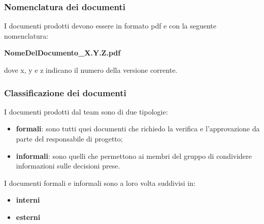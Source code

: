 \subsubsection{Nomenclatura dei documenti}
I documenti prodotti devono essere in formato pdf e con la seguente nomenclatura:
\begin{center}
    \textbf{NomeDelDocumento\_X.Y.Z.pdf}
\end{center}
dove x, y e z indicano il numero della versione corrente.

\subsubsection{Classificazione dei documenti}
I documenti prodotti dal team sono di due tipologie:
\begin{itemize}
    \item \textbf{formali}: sono tutti quei documenti che richiedo la verifica e l'approvazione da parte del responsabile di progetto;
    \item \textbf{informali}: sono quelli che permettono ai membri del gruppo di condividere informazioni sulle decisioni prese.
\end{itemize}
I documenti formali e informali sono a loro volta suddivisi in:
\begin{itemize}
    \item\textbf{interni}
    \item\textbf{esterni}
\end{itemize}

